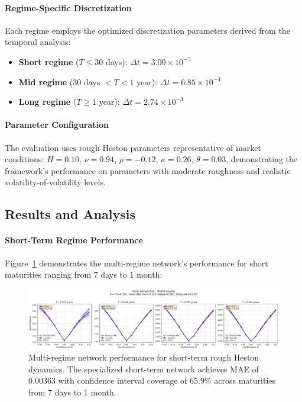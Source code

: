 	\paragraph{Regime-Specific Discretization}
	Each regime employs the optimized discretization parameters derived from the temporal analysis:
	\begin{itemize}[nosep]
		\item \textbf{Short regime} ($T \leq 30$ days): $\Delta t = 3.00 \times 10^{-5}$
		\item \textbf{Mid regime} (30 days $< T < 1$ year): $\Delta t = 6.85 \times 10^{-4}$
		\item \textbf{Long regime} ($T \geq 1$ year): $\Delta t = 2.74 \times 10^{-3}$
	\end{itemize}
	
	\paragraph{Parameter Configuration}
	The evaluation uses rough Heston parameters representative of market conditions:
	$H = 0.10$, $\nu = 0.94$, $\rho = -0.12$, $\kappa = 0.26$, $\theta = 0.03$, demonstrating the framework's performance on parameters with moderate roughness and realistic volatility-of-volatility levels.
	
	\subsection{Results and Analysis}
	
	\paragraph{Short-Term Regime Performance}
	
	Figure~\ref{fig:multiregime-short} demonstrates the multi-regime network's performance for short maturities ranging from 7 days to 1 month:
	
	\begin{figure}[ht]
		\centering
		\includegraphics[width=\textwidth]{../images/smile_comparison_short_regime.png}
		\caption{Multi-regime network performance for short-term rough Heston dynamics. The specialized short-term network achieves MAE of 0.00363 with confidence interval coverage of 65.9\% across maturities from 7 days to 1 month.}
		\label{fig:multiregime-short}
	\end{figure}
	
